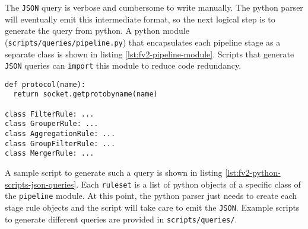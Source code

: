 The \texttt{JSON} query is verbose and cumbersome to write manually. The
python parser will eventually emit this intermediate format, so the next
logical  step is to generate
the query from python. A python module (\texttt{scripts/queries/pipeline.py})
that encapsulates each pipeline stage as a separate class is shown in listing
\ref{lst:fv2-pipeline-module}.  Scripts that generate \texttt{JSON} queries
can \texttt{import} this module to reduce code redundancy.

\begin{lstlisting}
def protocol(name):
  return socket.getprotobyname(name)

class FilterRule: ...
class GrouperRule: ...
class AggregationRule: ...
class GroupFilterRule: ...
class MergerRule: ...
\end{lstlisting}

A sample script to generate such a query is shown in listing
\ref{lst:fv2-python-scripts-json-queries}. Each \texttt{ruleset} is a list of
python objects of a specific class of the \texttt{pipeline} module. At this
point,  the python parser just needs to create
each stage rule objects and the script will take care to emit the
\texttt{JSON}. Example scripts to generate different queries are provided in
\texttt{scripts/queries/}.



